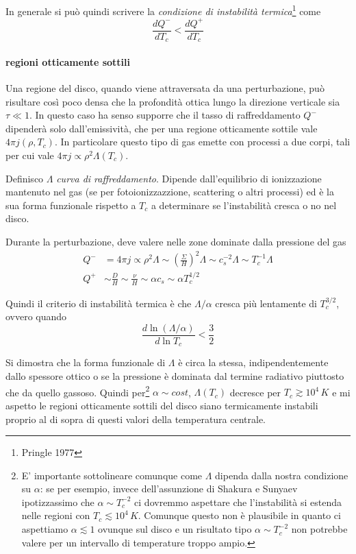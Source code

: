 \documentclass[a4paperbi]{article}
\begin{document}
	In generale si può quindi scrivere la \textit{condizione di instabilità termica}\footnote{Pringle 1977} come
	\begin{equation}
		\frac{dQ^-}{dT_c}<\frac{dQ^+}{dT_c}
	\end{equation}
	
	\paragraph{regioni otticamente sottili}
	Una regione del disco, quando viene attraversata da una perturbazione, può risultare così poco densa che la profondità ottica lungo la direzione verticale sia $\tau\ll1$. In questo caso ha senso supporre che il tasso di raffreddamento $Q^-$ dipenderà solo dall'emissività, che per una regione otticamente sottile vale $4\pi j(\rho,T_c)$. In particolare questo tipo di gas emette con processi a due corpi, tali per cui vale $4\pi j\propto \rho^2\Lambda(T_c)$. 
	
	Definisco $\Lambda$ \textit{curva di raffreddamento}. Dipende dall'equilibrio di ionizzazione mantenuto nel gas (se per fotoionizzazzione, scattering o altri processi) ed è la sua forma funzionale rispetto a $T_c$ a determinare se l'instabilità cresca o no nel disco.
	
	Durante la perturbazione, deve valere nelle zone dominate dalla pressione del gas
	\begin{align*}
		Q^-&=4\pi j\propto\rho^2\Lambda\sim\left(\frac{\Sigma}{H}\right)^2\Lambda\sim c_s^{-2}\Lambda\sim T_c^{-1}\Lambda\\
		Q^+&\sim\frac{D}{H}\sim\frac{\nu}{H}\sim\alpha c_s\sim\alpha T_c^{1/2}
	\end{align*}
	
	Quindi il criterio di instabilità termica è che $\Lambda/\alpha$ cresca più lentamente di $T_c^{3/2}$, ovvero quando
	\begin{equation}
		\frac{d\ln{(\Lambda/\alpha)}}{d\ln{T_c}}<\frac{3}{2}
	\end{equation}
	
	Si dimostra che la forma funzionale di $\Lambda$ è circa la stessa, indipendentemente dallo spessore ottico o se la pressione è dominata dal termine radiativo piuttosto che da quello gassoso. Quindi per\footnote{E' importante sottolineare comunque come $\Lambda$ dipenda dalla nostra condizione su $\alpha$: se per esempio, invece dell'assunzione di Shakura e Sunyaev ipotizzassimo che $\alpha\sim T^{-2}_c$ ci dovremmo aspettare che l'instabilità si estenda nelle regioni con $T_c\lesssim10^4\,K$. Comunque questo non è plausibile in quanto ci aspettiamo $\alpha\lesssim1$ ovunque sul disco e un risultato tipo $\alpha\sim T^{-2}_c$ non potrebbe valere per un intervallo di temperature troppo ampio.}
$\alpha\sim cost$, $\Lambda(T_c)$ decresce per $T_c\gtrsim10^4\,K$ e mi aspetto le regioni otticamente sottili del disco siano termicamente instabili proprio al di sopra di questi valori della temperatura centrale.
		
\end{document}
